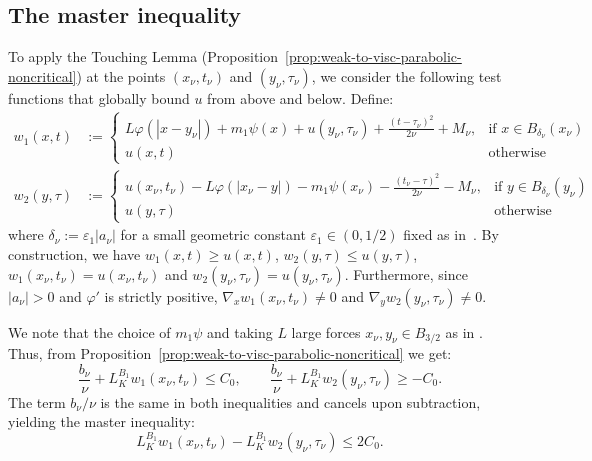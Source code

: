 \documentclass[11pt, a4paper, twoside]{article}
\theoremstyle{definition}
\theoremstyle{remark}
\begin{document}
\subsection{The master inequality}
\label{sec:master-inequality}

To apply the Touching Lemma (Proposition~\ref{prop:weak-to-visc-parabolic-noncritical}) at the points $(x_\nu,t_\nu)$ and $(y_\nu,\tau_\nu)$, we consider the following test functions that globally bound $u$ from above and below. Define:
\begin{align*}
  w_1(x,t) &:= \begin{cases}
     L\varphi(|x-y_\nu|) + m_1\psi(x) + u(y_\nu,\tau_\nu) + \frac{(t-\tau_\nu)^2}{2\nu} + M_\nu,& \text{if  $x\in B_{\delta_\nu}(x_{\nu})$}\\
      u(x,t) & \text{otherwise}
    \end{cases}  \\
  w_2(y,\tau) &:= \begin{cases}
     u(x_\nu,t_\nu) - L\varphi(|x_\nu-y|) - m_1\psi(x_\nu) - \frac{(t_\nu-\tau)^2}{2\nu} - M_\nu,& \text{if  $y\in B_{\delta_\nu}(y_{\nu})$}\\
      u(y,\tau) & \text{otherwise}
    \end{cases} 
\end{align*}
where $\delta_\nu := \varepsilon_1|a_\nu|$ for a small geometric constant $\varepsilon_1 \in (0,1/2)$ fixed as in~\cite{BiswasTopp2025}. By construction, we have $w_1(x,t) \ge u(x,t)$, $w_2(y,\tau) \le u(y,\tau)$, $w_1(x_\nu,t_\nu)=u(x_\nu,t_\nu)$ and $w_2(y_\nu,\tau_\nu)=u(y_\nu,\tau_\nu)$. Furthermore, since $|a_\nu| > 0$ and $\varphi'$ is strictly positive, $\nabla_x w_1(x_\nu,t_\nu) \neq 0$ and $\nabla_y w_2(y_\nu,\tau_\nu) \neq 0$. 

We note that the choice of $m_1\psi$ and taking $L$ large forces $x_\nu, y_\nu \in B_{3/2}$ as in \cite{BiswasTopp2025}. Thus, from  Proposition~\ref{prop:weak-to-visc-parabolic-noncritical} we get:
\[
  \frac{b_\nu}{\nu} + L_K^{B_1} w_1(x_\nu,t_\nu) \le C_0,
  \qquad
  \frac{b_\nu}{\nu} + L_K^{B_1} w_2(y_\nu,\tau_\nu) \ge -C_0.
\]
The term $b_\nu/\nu$ is the same in both inequalities and cancels upon subtraction, yielding the master inequality:
\begin{equation}\label{eq:parabolic-master}
  L_K^{B_1} w_1(x_\nu,t_\nu) - L_K^{B_1} w_2(y_\nu,\tau_\nu) \le 2C_0.
\end{equation}
\end{document}
